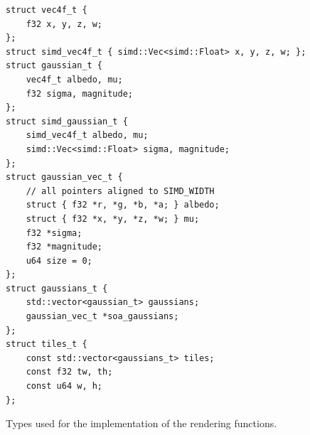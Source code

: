 \documentclass[a4paper, 11pt]{memoir}
\begin{document}
    \begin{listing}[t]
        \begin{verbatim}
struct vec4f_t {
    f32 x, y, z, w;
};
struct simd_vec4f_t { simd::Vec<simd::Float> x, y, z, w; };
struct gaussian_t {
    vec4f_t albedo, mu;
    f32 sigma, magnitude;
};
struct simd_gaussian_t {
    simd_vec4f_t albedo, mu;
    simd::Vec<simd::Float> sigma, magnitude;
};
struct gaussian_vec_t {
    // all pointers aligned to SIMD_WIDTH
    struct { f32 *r, *g, *b, *a; } albedo;
    struct { f32 *x, *y, *z, *w; } mu;
    f32 *sigma;
    f32 *magnitude;
    u64 size = 0;
};
struct gaussians_t {
    std::vector<gaussian_t> gaussians;
    gaussian_vec_t *soa_gaussians;
};
struct tiles_t {
    const std::vector<gaussians_t> tiles;
    const f32 tw, th;
    const u64 w, h;
};
        \end{verbatim}
        \caption{Types used for the implementation of the rendering functions.}
        \label{lst:types_vrt_full}
    \end{listing}

    \backmatter
    \printglossaries
    \printbibliography[heading=bibintoc]
\end{document}
